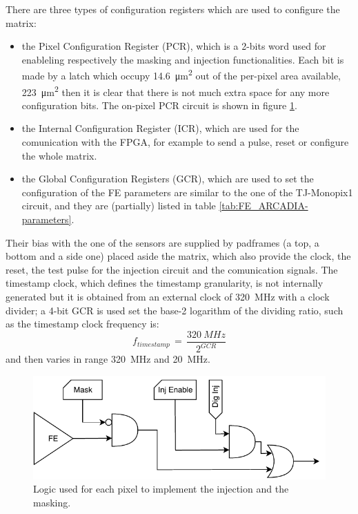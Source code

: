        There are three types of configuration registers which are used to configure the matrix: 
        \begin{itemize}
            \item the Pixel Configuration Register (PCR), which is a 2-bits word used for enableling respectively the masking and injection functionalities. Each bit is made by a latch which occupy \SI{14.6}{\um\squared} out of the per-pixel area available, \SI{223}{\um\squared} then it is clear that there is not much extra space for any more configuration bits. The on-pixel PCR circuit is shown in figure \ref{fig:pixel_cfg}.
            \item the Internal Configuration Register (ICR), which are used for the comunication with the FPGA, for example to send a pulse, reset or configure the whole matrix.
            \item the Global Configuration Registers (GCR), which are used to set the configuration of the FE parameters are similar to the one of the TJ-Monopix1 circuit, and they are (partially) listed in table \ref{tab:FE_ARCADIA-parameters}.
        \end{itemize}
        Their bias with the one of the sensors are supplied by padframes (a top, a bottom and a side one) placed aside the matrix, which also provide the clock, the reset, the test pulse for the injection circuit and the comunication signals.
        The timestamp clock, which defines the timestamp granularity, is not internally generated but it is obtained from an external clock of \SI{320}{MHz} with a clock divider; a 4-bit GCR is used set the base-2 logarithm of the dividing ratio, such as the timestamp clock frequency is:
        \begin{equation}
            f_{timestamp}\, =\, \frac{\SI{320}{MHz}}{2^{GCR}}
        \end{equation}
        and then varies in range \SI{320}{MHz} and \SI{20}{MHz}.\\
        \begin{figure}[h!]
            \centering
            \includegraphics[width=.7\linewidth]{figures/ARCADIA/pixel_cfg.pdf}
            \caption{Logic used for each pixel to implement the injection and the masking.}
            \label{fig:pixel_cfg}
        \end{figure}    

